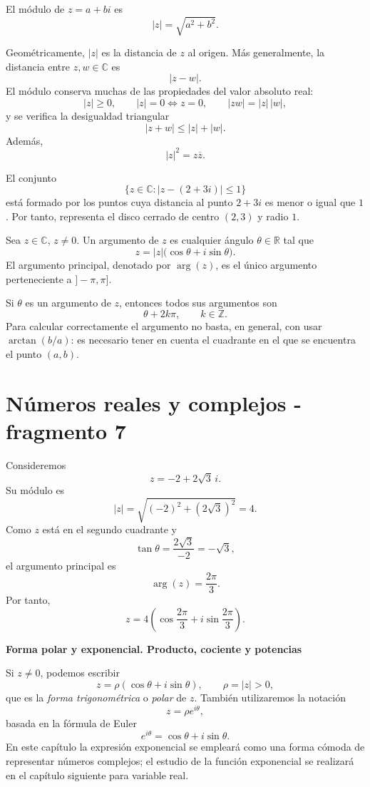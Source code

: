 \begin{definition}[Módulo]
El módulo de \(z=a+bi\) es
\[
|z|=\sqrt{a^2+b^2}.
\]
\end{definition}

Geométricamente, \(|z|\) es la distancia de \(z\) al origen. Más generalmente, la distancia entre \(z,w\in\mathbb{C}\) es
\[
|z-w|.
\]
El módulo conserva muchas de las propiedades del valor absoluto real:
\[
|z|\geq0,
\qquad
|z|=0\Longleftrightarrow z=0,
\qquad
|zw|=|z|\,|w|,
\]
y se verifica la desigualdad triangular
\[
|z+w|\leq|z|+|w|.
\]
Además,
\[
|z|^2=z\overline z.
\]

\begin{example}
El conjunto
\[
\{z\in\mathbb{C}:|z-(2+3i)|\leq1\}
\]
está formado por los puntos cuya distancia al punto \(2+3i\) es menor o igual que \(1\). Por tanto, representa el disco cerrado de centro \((2,3)\) y radio \(1\).
\end{example}

\begin{definition}[Argumento]
Sea \(z\in\mathbb{C}\), \(z\neq0\). Un argumento de \(z\) es cualquier ángulo \(\theta\in\mathbb{R}\) tal que
\[
z=|z|\bigl(\cos\theta+i\sin\theta\bigr).
\]
El argumento principal, denotado por \(\arg(z)\), es el único argumento perteneciente a \(]-\pi,\pi]\).
\end{definition}

Si \(\theta\) es un argumento de \(z\), entonces todos sus argumentos son
\[
\theta+2k\pi,\qquad k\in\mathbb{Z}.
\]
Para calcular correctamente el argumento no basta, en general, con usar \(\arctan(b/a)\): es necesario tener en cuenta el cuadrante en el que se encuentra el punto \((a,b)\).


\section{Números reales y complejos - fragmento 7}
\begin{example}
Consideremos
\[
z=-2+2\sqrt3\,i.
\]
Su módulo es
\[
|z|=\sqrt{(-2)^2+(2\sqrt3)^2}=4.
\]
Como \(z\) está en el segundo cuadrante y
\[
\tan\theta=\frac{2\sqrt3}{-2}=-\sqrt3,
\]
el argumento principal es
\[
\arg(z)=\frac{2\pi}{3}.
\]
Por tanto,
\[
z=4\left(\cos\frac{2\pi}{3}+i\sin\frac{2\pi}{3}\right).
\]
\end{example}

\textbf{Forma polar y exponencial. Producto, cociente y potencias}

Si \(z\neq0\), podemos escribir
\[
z=\rho(\cos\theta+i\sin\theta),
\qquad \rho=|z|>0,
\]
que es la \emph{forma trigonométrica} o \emph{polar} de \(z\). También utilizaremos la notación
\[
z=\rho e^{i\theta},
\]
basada en la fórmula de Euler
\[
e^{i\theta}=\cos\theta+i\sin\theta.
\]
En este capítulo la expresión exponencial se empleará como una forma cómoda de representar números complejos; el estudio de la función exponencial se realizará en el capítulo siguiente para variable real.

